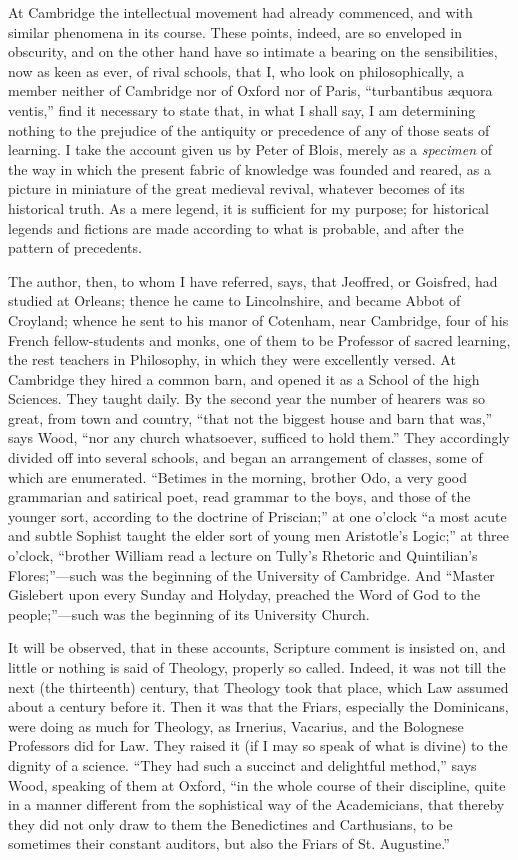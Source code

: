 At Cambridge the intellectual
movement had already commenced, and with similar phenomena in its
course. These points, indeed, are so enveloped in obscurity, and on
the other hand have so intimate a bearing on the sensibilities, now as
keen as ever, of rival schools, that I, who look on philosophically, a
member neither of Cambridge nor of Oxford nor of Paris, ``turbantibus
æquora ventis,'' find it necessary to state that, in what I shall
say, I am determining nothing to the prejudice of the antiquity or
precedence of any of those seats of learning. I take the account given
us by Peter of Blois, merely as a \emph{specimen} of the way in which
the present fabric of knowledge was founded and reared, as a picture
in miniature of the great medieval revival, whatever becomes of its
historical truth. As a mere legend, it is sufficient for my purpose;
for historical legends and fictions are made according to what
is probable, and after the pattern of precedents.

The author, then, to whom I
have referred, says, that Jeoffred, or Goisfred, had studied at
Orleans; thence he came to Lincolnshire, and became Abbot of Croyland;
whence he sent to his manor of Cotenham, near Cambridge, four of his
French fellow-students and monks, one of them to be Professor of
sacred learning, the rest teachers in Philosophy, in which they were
excellently versed. At Cambridge they hired a common barn, and opened
it as a School of the high Sciences. They taught daily. By the second
year the number of hearers was so great, from town and country, ``that not the biggest house and barn that was,'' says Wood,
``nor
any church whatsoever, sufficed to hold them.'' They accordingly
divided off into several schools, and began an arrangement of classes,
some of which are enumerated. ``Betimes in the morning, brother Odo,
a very good grammarian and satirical poet, read grammar to the boys,
and those of the younger sort, according to the doctrine of Priscian;''
at one o'clock ``a most acute and subtle Sophist taught the elder
sort of young men Aristotle's Logic;'' at three o'clock, ``brother
William read a lecture on Tully's Rhetoric and Quintilian's
Flores;''—such was the beginning of the University of Cambridge.
And ``Master Gislebert upon every Sunday and Holyday, preached the
Word of God to the people;''—such was the beginning of its
University Church.

It will be observed, that in
these accounts, Scripture comment is insisted on, and little or
nothing is said of Theology, properly so called. Indeed, it was not
till the next (the thirteenth) century, that Theology took that place,
which Law assumed about a century before it. Then it was that
the Friars, especially the Dominicans, were doing as much for
Theology, as Irnerius, Vacarius, and the Bolognese Professors did for
Law. They raised it (if I may so speak of what is divine) to the
dignity of a science. ``They had such a succinct and delightful
method,'' says Wood, speaking of them at Oxford, ``in the whole
course of their discipline, quite in a manner different from the
sophistical way of the Academicians, that thereby they did not only
draw to them the Benedictines and Carthusians, to be sometimes their
constant auditors, but also the Friars of St. Augustine.''

